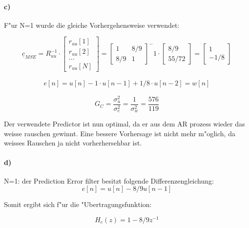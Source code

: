 \paragraph{c)}

F"ur N=1 wurde die gleiche Vorhergehensweise verwendet:

\begin{equation}
 \underline{c}_{MSE} = R_{uu}^{-1} \cdot \begin{bmatrix} r_{uu}[1] \\ r_{uu}[2] \\ ... \\ r_{uu}[N]\end{bmatrix}
 = \begin{bmatrix} 1 & 8/9 \\ 8/9 & 1\end{bmatrix}^-1 \cdot \begin{bmatrix}8/9 \\55/72\end{bmatrix}
 = \begin{bmatrix}1 \\ -1/8\end{bmatrix}
\end{equation}

\begin{align}
 e[n] = u[n] - 1\cdot u[n-1] + 1/8 \cdot u[n-2] = w[n]
\end{align}

\begin{equation}
 G_C = \frac{\sigma_u^2}{\sigma_e^2} = \frac{1}{\sigma_w^2} = \frac{576}{119}
\end{equation}


Der verwendete Predictor ist nun optimal, da er aus dem AR prozess wieder das weisse rauschen gewinnt.
Eine bessere Vorhersage ist nicht mehr m"oglich, da weisses Rauschen ja nicht vorherhersehbar ist.

\paragraph{d)}

N=1: der Prediction Error filter besitzt folgende Differenzengleichung:
\begin{equation}
 e[n] = u[n] - 8/9 u[n-1]
\end{equation}

Somit ergibt sich f"ur die "Ubertragungsfunktion:

\begin{equation}
 H_e(z) = 1-8/9z^{-1}
\end{equation}


